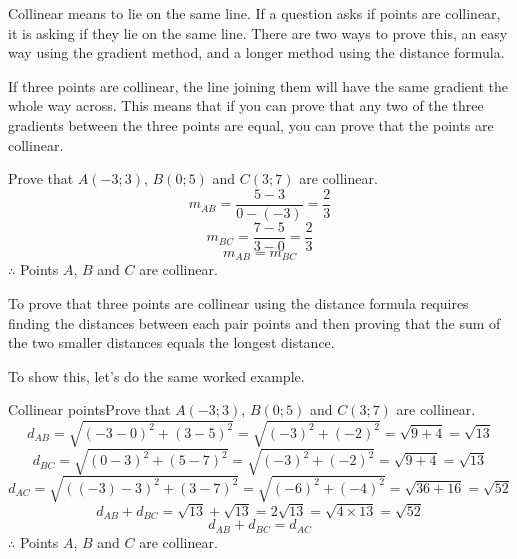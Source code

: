Collinear means to lie on the same line. If a question asks if points are collinear, it is asking if they lie
on the same line. There are two ways to prove this, an easy way using the gradient method, and a
longer method using the distance formula.

If three points are collinear, the line joining them will have the same gradient the whole way across.
This means that if you can prove that any two of the three gradients between the three points are
equal, you can prove that the points are collinear.

\begin{wex}{}{Prove that $A(-3;3)$, $B(0;5)$ and $C(3;7)$ are collinear.}{
\begin{equation*}
 m_{AB} = \frac{5-3}{0-(-3)} = \frac{2}{3}
\end{equation*}
\begin{equation*}
 m_{BC} = \frac{7-5}{3-0} = \frac{2}{3}
\end{equation*}
\begin{equation*}
 m_{AB} = m_{BC}
\end{equation*}
$\therefore$ Points $A$, $B$ and $C$ are collinear.
}
\end{wex}

To prove that three points are collinear using the distance formula requires finding the
distances between each pair points and then proving that the sum of the two smaller distances
equals the longest distance.

To show this, let's do the same worked example.

\begin{wex}{Collinear points}{Prove that $A(-3;3)$, $B(0;5)$ and $C(3;7)$ are collinear.}{
\begin{equation*}
 d_{AB} = \sqrt{(-3 - 0)^2 + (3 - 5)^2} = \sqrt{(-3)^2 + (-2)^2} = \sqrt{9 + 4} = \sqrt{13}
\end{equation*}
\begin{equation*}
 d_{BC} = \sqrt{(0 - 3)^2 + (5 - 7)^2} = \sqrt{(-3)^2 + (-2)^2} = \sqrt{9 + 4} = \sqrt{13}
\end{equation*}
\begin{equation*}
 d_{AC} = \sqrt{((-3) - 3)^2 + (3 - 7)^2} = \sqrt{(-6)^2 + (-4)^2} = \sqrt{36 + 16} = \sqrt{52}
\end{equation*}
\begin{equation*}
 d_{AB} + d_{BC} = \sqrt{13} + \sqrt{13} = 2\sqrt{13} = \sqrt{4 \times 13} = \sqrt{52}
\end{equation*}
\begin{equation*}
 d_{AB} + d_{BC} = d_{AC}
\end{equation*}
$\therefore$ Points $A$, $B$ and $C$ are collinear.
}
\end{wex}

